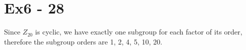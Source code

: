 \section*{Ex6 - 28}
Since $ Z_{20} $ is cyclic, we have exactly one subgroup for each factor of its order, therefore the subgroup orders are {1, 2, 4, 5, 10, 20}.  
